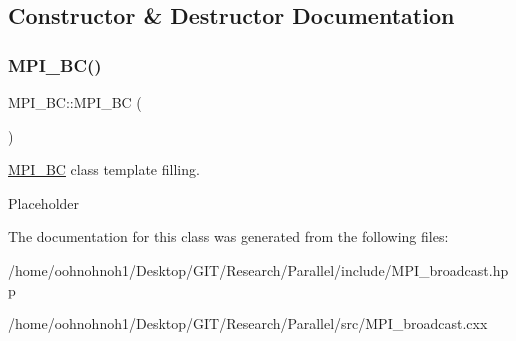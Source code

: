 \subsection{Constructor \& Destructor Documentation}
\mbox{\label{classMPI__BC_a1c761fcc4df7e6809a0ffd2a20cebd12}} 
\subsubsection{\texorpdfstring{M\+P\+I\+\_\+\+B\+C()}{MPI\_BC()}}
{\footnotesize\ttfamily M\+P\+I\+\_\+\+B\+C\+::\+M\+P\+I\+\_\+\+BC (\begin{DoxyParamCaption}{ }\end{DoxyParamCaption})}



\hyperlink{classMPI__BC}{M\+P\+I\+\_\+\+BC} class template filling. 

Placeholder 

The documentation for this class was generated from the following files\+:\begin{DoxyCompactItemize}
\item 
/home/oohnohnoh1/\+Desktop/\+G\+I\+T/\+Research/\+Parallel/include/M\+P\+I\+\_\+broadcast.\+hpp\item 
/home/oohnohnoh1/\+Desktop/\+G\+I\+T/\+Research/\+Parallel/src/M\+P\+I\+\_\+broadcast.\+cxx\end{DoxyCompactItemize}
